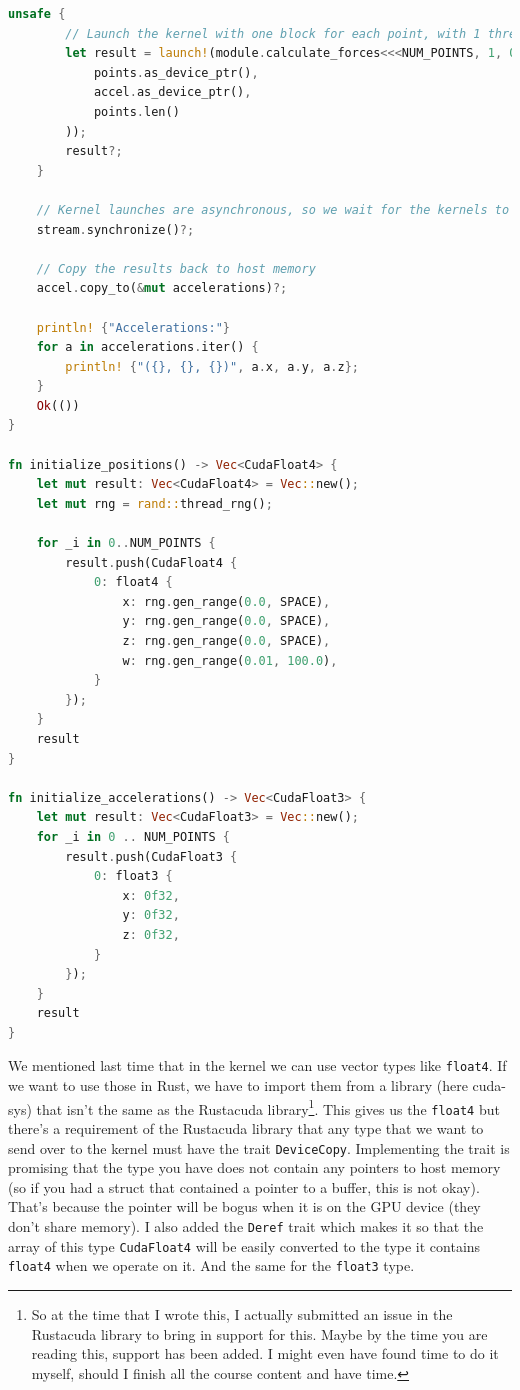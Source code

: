 \documentclass[a4paper]{report}
\begin{document}
\begin{lstlisting}[language=Rust]
    unsafe {
        // Launch the kernel with one block for each point, with 1 thread each, no dynamic shared memory on `stream`.
        let result = launch!(module.calculate_forces<<<NUM_POINTS, 1, 0, stream>>>(
            points.as_device_ptr(),
            accel.as_device_ptr(),
            points.len()
        ));
        result?;
    }

    // Kernel launches are asynchronous, so we wait for the kernels to finish executing.
    stream.synchronize()?;

    // Copy the results back to host memory
    accel.copy_to(&mut accelerations)?;

    println! {"Accelerations:"}
    for a in accelerations.iter() {
        println! {"({}, {}, {})", a.x, a.y, a.z};
    }
    Ok(())
}

fn initialize_positions() -> Vec<CudaFloat4> {
    let mut result: Vec<CudaFloat4> = Vec::new();
    let mut rng = rand::thread_rng();

    for _i in 0..NUM_POINTS {
        result.push(CudaFloat4 {
            0: float4 {
                x: rng.gen_range(0.0, SPACE),
                y: rng.gen_range(0.0, SPACE),
                z: rng.gen_range(0.0, SPACE),
                w: rng.gen_range(0.01, 100.0),
            }
        });
    }
    result
}

fn initialize_accelerations() -> Vec<CudaFloat3> {
    let mut result: Vec<CudaFloat3> = Vec::new();
    for _i in 0 .. NUM_POINTS {
        result.push(CudaFloat3 {
            0: float3 {
                x: 0f32,
                y: 0f32,
                z: 0f32,
            }
        });
    }
    result
}
\end{lstlisting}

We mentioned last time that in the kernel we can use vector types like \texttt{float4}. If we want to use those in Rust, we have to import them from a library (here cuda-sys) that isn't the same as the Rustacuda library\footnote{So at the time that I wrote this, I actually submitted an issue in the Rustacuda library to bring in support for this. Maybe by the time you are reading this, support has been added. I might even have found time to do it myself, should I finish all the course content and have time.}. This gives us the \texttt{float4} but there's a requirement of the Rustacuda library that any type that we want to send over to the kernel must have the trait \texttt{DeviceCopy}. Implementing the trait is promising that the type you have does not contain any pointers to host memory (so if you had a struct that contained a pointer to a buffer, this is not okay). That's because the pointer will be bogus when it is on the GPU device (they don't share memory). I also added the \texttt{Deref} trait which makes it so that the array of this type \texttt{CudaFloat4} will be easily converted to the type it contains \texttt{float4} when we operate on it. And the same for the \texttt{float3} type.
\end{document}
